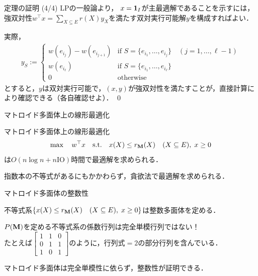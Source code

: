 \documentclass[14pt,aspectratio=169,xcolor=dvipsnames,table,onlytextwidth,dvipdfmx]{beamer}
\begin{document}
\begin{frame}{定理の証明 (4/4)}
    \small
    LPの一般論より，
    $x = \mathbf{1}_I$が主最適解であることを示すには，強双対性$w^\top x = \sum_{X \subseteq E} r(X)y_X$を満たす双対実行可能解$y$を構成すればよい．

    \bigskip
    実際，
    \begin{align*}
        y_S := \begin{cases}
        w(e_{i_j}) - w(e_{i_{j+1}}) & \text{if } S = \{e_{i_1}, \dots, e_{i_j}\} \quad (j = 1, \dots, \ell - 1) \\
        w(e_{i_\ell})                 & \text{if } S = \{e_{i_1}, \dots, e_{i_\ell}\} \\
        0                             & \text{otherwise}
        \end{cases}
    \end{align*}
    とすると，$y$は双対実行可能で，$(x, y)$が強双対性を満たすことが，直接計算により確認できる（各自確認せよ）． \qed
\end{frame}

\begin{frame}{マトロイド多面体上の線形最適化}
    \begin{corollary}
        マトロイド多面体上の線形最適化
        \[  
              \max \quad w^\top x \quad\text{s.t.}\quad x(X) \leq r_{\mathbf{M}}(X) \quad (X \subseteq E), \; x \geq 0
        \] 
        は$O(n \log n + n \mathrm{IO})$時間で最適解を求められる．
    \end{corollary}

    \bigskip
    指数本の不等式があるにもかかわらず，貪欲法で最適解を求められる．
\end{frame}

\begin{frame}{マトロイド多面体の整数性}
    \begin{corollary}
        不等式系$\{x(X) \leq r_{\mathbf{M}}(X) \quad (X \subseteq E), \; x \geq 0\}$は整数多面体を定める．
    \end{corollary}

    \bigskip
    $P(\mathbf{M})$を定める不等式系の係数行列は\alert{完全単模行列ではない！}\\
    {\footnotesize {}たとえば$\begin{bmatrix}
        1 & 1 & 0 \\
        0 & 1 & 1 \\
        1 & 0 & 1
    \end{bmatrix}$のように，行列式$=2$の部分行列を含んでいる．}

    \bigskip
    マトロイド多面体は完全単模性に依らず，整数性が証明できる．
\end{frame}
\end{document}
